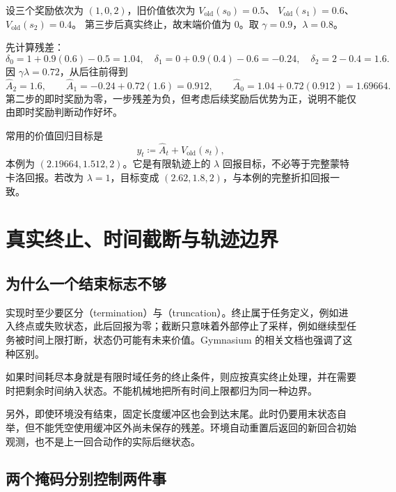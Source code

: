 \documentclass[UTF8]{ctexart}
\begin{document}
\begin{example}
\label{ex:ppo-gae}
设三个奖励依次为 $(1,0,2)$，旧价值依次为
$V_{\mathrm{old}}(s_0)=0.5$、
$V_{\mathrm{old}}(s_1)=0.6$、
$V_{\mathrm{old}}(s_2)=0.4$。
第三步后真实终止，故末端价值为 $0$。取 $\gamma=0.9$，$\lambda=0.8$。
\end{example}
\begin{solve}
先计算残差：
\[
  \delta_0=1+0.9(0.6)-0.5=1.04,\quad
  \delta_1=0+0.9(0.4)-0.6=-0.24,\quad
  \delta_2=2-0.4=1.6.
\]
因 $\gamma\lambda=0.72$，从后往前得到
\[
  \widehat A_2=1.6,\qquad
  \widehat A_1=-0.24+0.72(1.6)=0.912,\qquad
  \widehat A_0=1.04+0.72(0.912)=1.69664.
\]
第二步的即时奖励为零，一步残差为负，但考虑后续奖励后优势为正，说明不能仅由即时奖励判断动作好坏。

常用的价值回归目标是
\begin{equation}
  y_t\coloneqq\widehat A_t+V_{\mathrm{old}}(s_t),
  \label{eq:ppo-value-target}
\end{equation}
本例为 $(2.19664,1.512,2)$。它是有限轨迹上的 $\lambda$ 回报目标，不必等于完整蒙特卡洛回报。若改为 $\lambda=1$，目标变成 $(2.62,1.8,2)$，与本例的完整折扣回报一致。
\end{solve}

\section{真实终止、时间截断与轨迹边界}
\label{sec:ppo-boundaries}

\subsection{为什么一个结束标志不够}

实现时至少要区分（termination）与（truncation）。终止属于任务定义，例如进入终点或失败状态，此后回报为零；截断只意味着外部停止了采样，例如继续型任务被时间上限打断，状态仍可能有未来价值。Gymnasium 的相关文档也强调了这种区别\cite{gymnasium-time-limits}。

如果时间耗尽本身就是有限时域任务的终止条件，则应按真实终止处理，并在需要时把剩余时间纳入状态。不能机械地把所有时间上限都归为同一种边界。

另外，即使环境没有结束，固定长度缓冲区也会到达末尾。此时仍要用末状态自举，但不能凭空使用缓冲区外尚未保存的残差。环境自动重置后返回的新回合初始观测，也不是上一回合动作的实际后继状态。

\subsection{两个掩码分别控制两件事}
\end{document}
